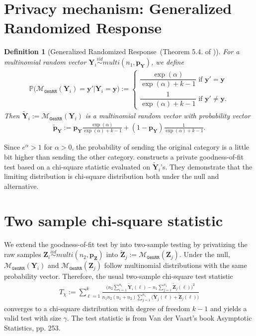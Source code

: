 \documentclass[11pt]{article} %
\newcommand{\vecBold}[1]{\boldsymbol{#1}} %
\newcommand{\sampleSize}{n}
\newcommand{\distparamMultinom}{\boldsymbol{p}}
\newcommand{\mP}{\mathbb{P}} %
\newcommand{\alphabetSize}{k}
\newcommand{\genrr}{\mathcal{M}_{\texttt{GenRR}}}
\newcommand{\rvY}{Y}
\newcommand{\rVecY}{\vecBold{\rvY}}
\newcommand{\rvZ}{Z}
\newcommand{\rVecZ}{\vecBold{\rvZ}}
\newtheorem{definition}{Definition}[section]
\begin{document}
\section{Privacy mechanism: Generalized Randomized Response}
\begin{definition}[Generalized Randomized Response~(Theorem 5.4. of \citet{Gaboardi2018LDPChisq})]
For a multinomial random vector 
$
\rVecY_i \stackrel{iid}{\sim}multi(\sampleSize_1, \distparamMultinom_{\rVecY})$, 
we define
\begin{align*}
\mP
\bigl(
\genrr(\rVecY_i) = \vecBold{y}'
|
\rVecY_i = \vecBold{y}
\bigr)
:=
\begin{cases}
\dfrac
	{\exp(\alpha)}
	{\exp(\alpha) + \alphabetSize - 1 }
	\text{ if }
	\vecBold{y}' = \vecBold{y}
	\\
\dfrac
	{1}
	{\exp(\alpha) + \alphabetSize - 1 }	
	\text{ if }
	\vecBold{y}' \neq \vecBold{y}.
\end{cases}
\end{align*}
Then  $\tilde{\rVecY}_i:=\genrr(\rVecY_i)$ is a multinomial random vector with probability vector
\begin{align*}
\tilde{\distparamMultinom}_{\rVecY}
:=
\distparamMultinom_{\rVecY}
	\frac
	{\exp(\alpha)}
	{\exp(\alpha) + \alphabetSize - 1 }
	+
(1-\distparamMultinom_{\rVecY})	
	\frac
	{1}
	{\exp(\alpha) + \alphabetSize - 1 }.
\end{align*}
\end{definition}
\noindent
Since $e^\alpha>1$ for $\alpha>0$, the probability of sending the original category is a little bit higher than sending the other category.
\citet{Gaboardi2018LDPChisq} constructs a private goodness-of-fit test based on a chi-square statistic evaluated on $\tilde{\rVecY}_i$'s.
They demonstrate that the limiting distribution is chi-square distribution both under the null and alternative.



\section{Two sample chi-square statistic}
We extend the goodness-of-fit test by \citet{Gaboardi2018LDPChisq} into two-sample testing by privatizing the raw samples
$\rVecZ_i \stackrel{iid}{\sim}multi(\sampleSize_2, \distparamMultinom_{\rVecZ})$
into $\tilde{\rVecZ}_j := \genrr(\rVecZ_j)$. 
Under the null, $\genrr(\rVecY_i)$ and $\genrr(\rVecZ_j)$ follow multinomial distributions with the same probability vector.
 Therefore, the usual two-sample chi-square test statistic
 	\begin{align*}
		T_{\chi} :=
		\sum_{\ell=1}^k
		\frac{
		\bigl(
		n_2
		\sum_{i=1}^{n_1}\tilde{\rVecY}_i(\ell)
		-
		n_1
		\sum_{j=1}^{n_1}\tilde{\rVecZ}_j(\ell)
		\bigr)^2
		}{
		n_1 n_2 (n_1 + n_2) 
		\sum_{j=1}^{n_1}
		\bigl(
		\tilde{\rVecY}_j(\ell)+\tilde{\rVecZ}_j(\ell)
		\bigr)
		}
	\end{align*}
  converges to a chi-square distribution with degree of freedom $\alphabetSize-1$ and yields a valid  test with size $\gamma$.
The test statistic is from Van der Vaart's book Asymptotic Statistics, pp. 253.
\end{document}
